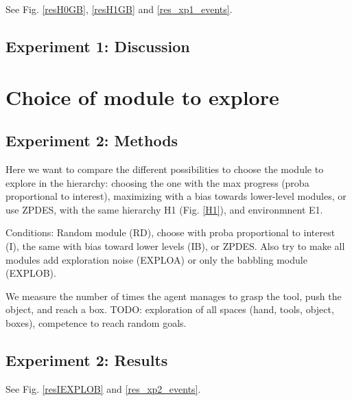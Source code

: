 \documentclass[conference]{include/IEEEtran}
\begin{document}
		
		See Fig. \ref{resH0GB}, \ref{resH1GB} and \ref{res_xp1_events}.
		
	
	\subsection{Experiment 1: Discussion}	
	

%
	
\section{Choice of module to explore}


	
	\subsection{Experiment 2: Methods}	
		
		Here we want to compare the different possibilities to choose the module to explore in the hierarchy: choosing the one with the max progress (proba proportional to interest), 
		maximizing with a bias towards lower-level modules, or use ZPDES,
		with the same hierarchy H1 (Fig. \ref{H1}), and environmnent E1.
			
		Conditions: Random module (RD), choose with proba proportional to interest (I), the same with bias toward lower levels (IB), or ZPDES.
		Also try to make all modules add exploration noise (EXPLOA) or only the babbling module (EXPLOB).
			
		We measure the number of times the agent manages to grasp the tool, push the object, and reach a box.
		TODO: exploration of all spaces (hand, tools, object, boxes), competence to reach random goals.
		
	
	\subsection{Experiment 2: Results}

		See Fig. \ref{resIEXPLOB} and \ref{res_xp2_events}.
		
\end{document}
